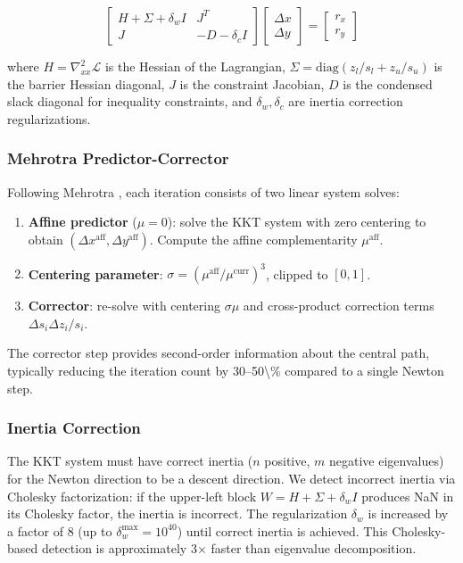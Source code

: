 \documentclass[12pt,preprint]{article}
\begin{document}
\begin{equation}
\begin{bmatrix}
H + \Sigma + \delta_w I & J^T \\
J & -D - \delta_c I
\end{bmatrix}
\begin{bmatrix}
\Delta x \\
\Delta y
\end{bmatrix}
=
\begin{bmatrix}
r_x \\
r_y
\end{bmatrix}
\end{equation}


where $H = \nabla^2_{xx} \mathcal{L}$ is the Hessian of the Lagrangian, $\Sigma = \mathrm{diag}(z_l / s_l + z_u / s_u)$ is the barrier Hessian diagonal, $J$ is the constraint Jacobian, $D$ is the condensed slack diagonal for inequality constraints, and $\delta_w, \delta_c$ are inertia correction regularizations.

\subsubsection{Mehrotra Predictor-Corrector}
\label{org-mehrotra-predictor-corrector}
Following Mehrotra \cite{Mehrotra1992}, each iteration consists of two linear system solves:


\begin{enumerate}
\item \textbf{Affine predictor} ($\mu = 0$): solve the KKT system with zero centering to obtain $(\Delta x^{\mathrm{aff}}, \Delta y^{\mathrm{aff}})$. Compute the affine complementarity $\mu^{\mathrm{aff}}$.

\item \textbf{Centering parameter}: $\sigma = (\mu^{\mathrm{aff}} / \mu^{\mathrm{curr}})^3$, clipped to $[0, 1]$.

\item \textbf{Corrector}: re-solve with centering $\sigma\mu$ and cross-product correction terms $\Delta s_i \Delta z_i / s_i$.

\end{enumerate}


The corrector step provides second-order information about the central path, typically reducing the iteration count by 30--50\textbackslash{}\% compared to a single Newton step.

\subsubsection{Inertia Correction}
\label{org-inertia-correction}
The KKT system must have correct inertia ($n$ positive, $m$ negative eigenvalues) for the Newton direction to be a descent direction. We detect incorrect inertia via Cholesky factorization: if the upper-left block $W = H + \Sigma + \delta_w I$ produces NaN in its Cholesky factor, the inertia is incorrect. The regularization $\delta_w$ is increased by a factor of 8 (up to $\delta_w^{\max} = 10^{40}$) until correct inertia is achieved. This Cholesky-based detection is approximately 3$\times$ faster than eigenvalue decomposition.
\end{document}
